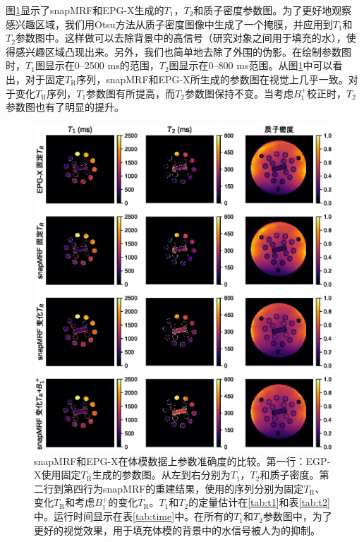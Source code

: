 图\ref{fig:phantom}显示了snapMRF和EPG-X生成的$T_1$，$T_2$和质子密度参数图。为了更好地观察感兴趣区域，我们用Otsu方法从质子密度图像中生成了一个掩膜，并应用到$T_1$和$T_2$参数图中。这样做可以去除背景中的高信号（研究对象之间用于填充的水），使得感兴趣区域凸现出来。另外，我们也简单地去除了外围的伪影。在绘制参数图时，$T_1$图显示在0--2500 ms的范围，$T_2$图显示在0--800 ms范围。从图\ref{fig:phantom}中可以看出，对于固定$T_\mathrm{R}$序列，snapMRF和EPG-X所生成的参数图在视觉上几乎一致。对于变化$T_\mathrm{R}$序列，$T_1$参数图有所提高，而$T_2$参数图保持不变。当考虑$B_1^+$校正时，$T_2$参数图也有了明显的提升。

\begin{figure}[htbp]
\centerline{\includegraphics[width=1\textwidth]{img/snapmrf/figure2.eps}}
\caption{snapMRF和EPG-X在体模数据上参数准确度的比较。第一行：EGP-X使用固定$T_\mathrm{R}$生成的参数图。从左到右分别为$T_1$，$T_2$和质子密度。第二行到第四行为snapMRF的重建结果，使用的序列分别为固定$T_\mathrm{R}$、变化$T_\mathrm{R}$和考虑$B_1^+$的变化$T_\mathrm{R}$。$T_1$和$T_2$的定量估计在\ref{tab:t1}和表\ref{tab:t2}中。运行时间显示在表\ref{tab:time}中。在所有的$T_1$和$T_2$参数图中，为了更好的视觉效果，用于填充体模的背景中的水信号被人为的抑制。
}
\label{fig:phantom}
\end{figure}


